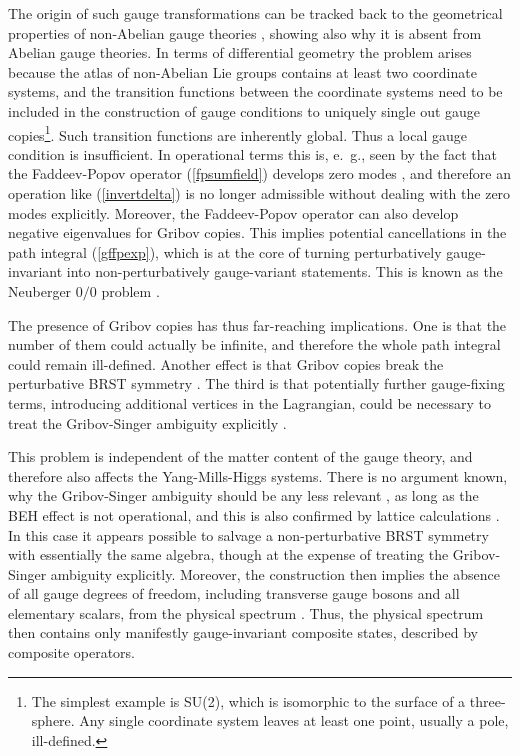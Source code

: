 \documentclass[final,twoside,12pt]{article}
\newcommand*{\pref}[1]{(\ref{#1})}
\newcommand*{\1}{1\!\!\!\bot}
\begin{document}
The origin of such gauge transformations can be tracked back to the geometrical properties of non-Abelian gauge theories \cite{Singer:1978dk}, showing also why it is absent from Abelian gauge theories. In terms of differential geometry the problem arises because the atlas of non-Abelian Lie groups contains at least two coordinate systems, and the transition functions between the coordinate systems need to be included in the construction of gauge conditions to uniquely single out gauge copies\footnote{The simplest example is SU(2), which is isomorphic to the surface of a three-sphere. Any single coordinate system leaves at least one point, usually a pole, ill-defined.}. Such transition functions are inherently global. Thus a local gauge condition is insufficient. In operational terms this is, e.\ g., seen by the fact that the Faddeev-Popov operator \pref{fpsumfield} develops zero modes \cite{Gribov:1977wm,Sobreiro:2005ec,Vandersickel:2012tg,Maas:2005qt}, and therefore an operation like \pref{invertdelta} is no longer admissible without dealing with the zero modes explicitly. Moreover, the Faddeev-Popov operator can also develop negative eigenvalues for Gribov copies. This implies potential cancellations in the path integral \pref{gffpexp}, which is at the core of turning perturbatively gauge-invariant into non-perturbatively gauge-variant statements. This is known as the Neuberger $0/0$ problem \cite{Neuberger:1986xz}.

The presence of Gribov copies has thus far-reaching implications. One is that the number of them could actually be infinite, and therefore the whole path integral could remain ill-defined. Another effect is that Gribov copies break the perturbative BRST symmetry \cite{Fujikawa:1982ss,Sorella:2009vt,Maas:2012ct}. The third is that potentially further gauge-fixing terms, introducing additional vertices in the Lagrangian, could be necessary to treat the Gribov-Singer ambiguity explicitly \cite{Maas:2011se,Vandersickel:2012tg,Serreau:2012cg}.

This problem is independent of the matter content of the gauge theory, and therefore also affects the Yang-Mills-Higgs systems. There is no argument known, why the Gribov-Singer ambiguity should be any less relevant \cite{Lenz:1994tb,Lenz:2000zt,Maas:2011se,Maas:2010nc,Capri:2012ah,Capri:2012cr,Capri:2013oja,Capri:2013gha,Capri:2016gut,Greensite:2004ke}, as long as the BEH effect is not operational, and this is also confirmed by lattice calculations \cite{Maas:2010nc}. In this case it appears possible to salvage a non-perturbative BRST symmetry \cite{Maas:2012ct,Sorella:2009vt,vonSmekal:2008ws,Dudal:2009xh,Kondo:2009ug,Dudal:2010fq,Kondo:2009gc,Boucaud:2009sd,Sorella:2010it,Neuberger:1986xz,vonSmekal:2007ns,vonSmekal:2008es,Fischer:2008uz} with essentially the same algebra, though at the expense of treating the Gribov-Singer ambiguity explicitly. Moreover, the construction then implies the absence of all gauge degrees of freedom, including transverse gauge bosons and all elementary scalars, from the physical spectrum \cite{Kugo:1979gm,Fischer:2008uz,Maas:2011se}. Thus, the physical spectrum then contains only manifestly gauge-invariant composite states, described by composite operators.
\end{document}
